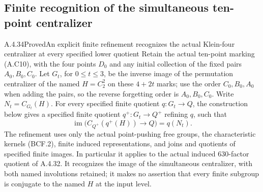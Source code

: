\subsection{Finite recognition of the simultaneous ten-point centralizer}

\begin{result}{A.4.34}{Proved}{An explicit finite refinement recognizes the actual Klein-four centralizer at every specified lower quotient}
Retain the actual ten-point marking (A.C10), with the four
points $D_0$ and any initial collection of the fixed pairs
$A_0,B_0,C_0$.  Let $G_t$, for $0\leq t\leq3$, be the
inverse image of the permutation centralizer of the named
$H=C_2^2$ on these $4+2t$ marks; use the order
$C_0,B_0,A_0$ when adding the pairs, so the reverse
forgetting order is $A_0,B_0,C_0$.
Write $N_t=C_{G_t}(H)$.  For every specified finite quotient
$q:G_t\to Q$, the construction below gives a specified
finite quotient $q^+:G_t\to Q^+$ refining $q$, such that
\[
 \operatorname{im}\bigl(C_{Q^+}(q^+(H))\longrightarrow Q\bigr)
                              =q(N_t).                 \tag{HCF.1}
\]
The refinement uses only the actual point-pushing free groups,
the characteristic kernels (BCF.2), finite induced
representations, and joins and quotients of specified finite
images.  In particular it applies to the actual induced
$630$-factor quotient of A.4.32.  It recognizes the image of
the simultaneous centralizer, with both named involutions
retained; it makes no assertion that every finite subgroup
is conjugate to the named $H$ at the input level.
\end{result}

